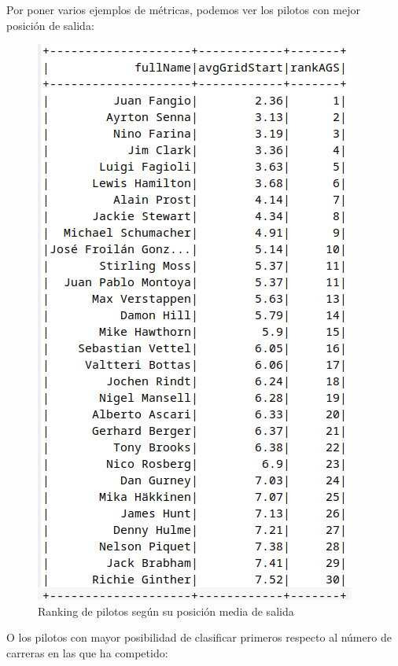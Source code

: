 \documentclass[12pt,twoside,titlepage]{report}
\begin{document}
Por poner varios ejemplos de métricas, podemos ver los pilotos con mejor posición de salida:

\begin{figure}[H]
	\includegraphics[scale=0.3]{results/bestdrivers/avggridstart.png}
	\centering
	\caption{Ranking de pilotos según su posición media de salida}
	\label{fig:avgGridStart}
	\centering
\end{figure}

O los pilotos con mayor posibilidad de clasificar primeros respecto al número de carreras en las que ha competido:
\end{document}
